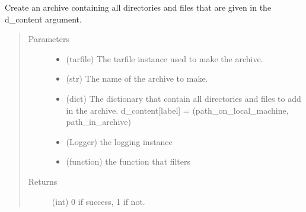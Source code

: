 \documentclass[a4paper,10pt,english]{sphinxmanual}
\begin{document}

\begin{fulllineitems}
\label{\detokenize{apidoc_commands/commands:commands.package.add_files}}
Create an archive containing all directories and files that are given 
in the d\_content argument.
\begin{quote}\begin{description}
\item[{Parameters}] \leavevmode\begin{itemize}
\item {} 
 \textendash{} (tarfile) The tarfile instance used to make the archive.

\item {} 
 \textendash{} (str) The name of the archive to make.

\item {} 
 \textendash{} (dict) 
The dictionary that contain all directories and files to add in the archive.
d\_content{[}label{]} = (path\_on\_local\_machine, path\_in\_archive)

\item {} 
 \textendash{} (Logger) the logging instance

\item {} 
 \textendash{} (function) the function that filters

\end{itemize}

\item[{Returns}] \leavevmode
(int) 0 if success, 1 if not.

\end{description}\end{quote}

\end{fulllineitems}


\begin{fulllineitems}
\label{\detokenize{apidoc_commands/commands:commands.package.add_readme}}
\end{fulllineitems}
\end{document}
